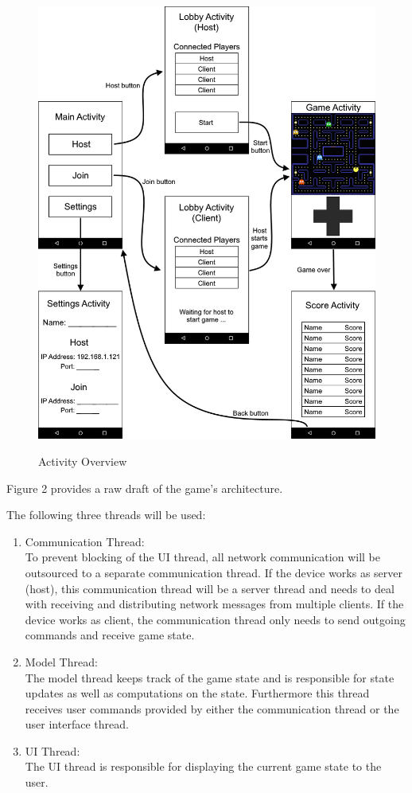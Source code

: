\documentclass{report}
\newcommand{\lfig}[1]{\label{fig:#1}}
\begin{document}
\begin{figure} [ht!]
	\centering
    \includegraphics[width=\columnwidth]{overview.png}
    \lfig{activity-overview}
    \vspace{-5mm} %
	\caption{Activity Overview}
\end{figure}

Figure 2 provides a raw draft of the game's architecture.

The following three threads will be used:
\begin{enumerate}
	\item Communication Thread:\\
	To prevent blocking of the UI thread, all network communication will be outsourced to a separate communication thread.
	If the device works as server (host), this communication thread will be a server thread and needs to deal with receiving and distributing network messages from multiple clients.
	If the device works as client, the communication thread only needs to send outgoing commands and receive game state.
	
	\item Model Thread:\\
	The model thread keeps track of the game state and is responsible for state updates as well as computations on the state. Furthermore this thread receives user commands provided by either the communication thread or the user interface thread.
	
	\item UI Thread:\\
	The UI thread is responsible for displaying the current game state to the user. 
\end{enumerate}
\end{document}
